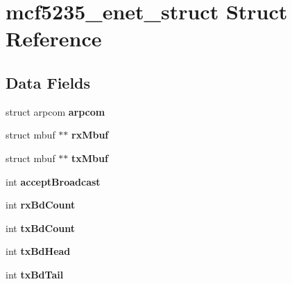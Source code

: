 \hypertarget{structmcf5235__enet__struct}{}\section{mcf5235\+\_\+enet\+\_\+struct Struct Reference}
\label{structmcf5235__enet__struct}
\subsection*{Data Fields}
\begin{DoxyCompactItemize}
\item 
\mbox{\label{structmcf5235__enet__struct_a82d4c9cb7904afa47e7d99f2e6fc47fb}} 
struct arpcom {\bfseries arpcom}
\item 
\mbox{\label{structmcf5235__enet__struct_a6d314503a7b9f57e9ab46573474bb76f}} 
struct mbuf $\ast$$\ast$ {\bfseries rx\+Mbuf}
\item 
\mbox{\label{structmcf5235__enet__struct_ab810c8dfed33c220737a52c48f0e41fe}} 
struct mbuf $\ast$$\ast$ {\bfseries tx\+Mbuf}
\item 
\mbox{\label{structmcf5235__enet__struct_a2c7eba5d39162b650d9a147b756bd1bf}} 
int {\bfseries accept\+Broadcast}
\item 
\mbox{\label{structmcf5235__enet__struct_a8071071b1318415cfa8033339d83d755}} 
int {\bfseries rx\+Bd\+Count}
\item 
\mbox{\label{structmcf5235__enet__struct_ae344de647ef2858f7e34435504022be4}} 
int {\bfseries tx\+Bd\+Count}
\item 
\mbox{\label{structmcf5235__enet__struct_a9c2d85c166eba1d49cc4511843220294}} 
int {\bfseries tx\+Bd\+Head}
\item 
\mbox{\label{structmcf5235__enet__struct_ac1c43a87d088111fd9f8b03a331aaf5a}} 
int {\bfseries tx\+Bd\+Tail}
\item 
\mbox{\label{structmcf5235__enet__struct_ac7857391add53deb13be71e4a5f05eb0}} 

\end{DoxyCompactItemize}
